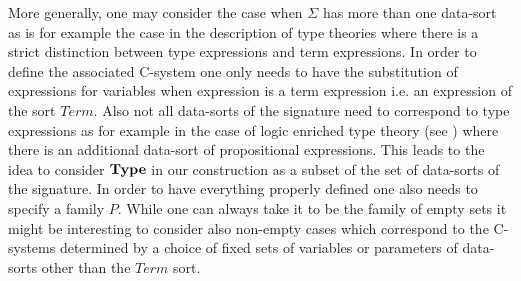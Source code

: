 \documentclass[11pt]{article}
\begin{document}
{More generally, one may consider the case when $\Sigma$ has more than one data-sort as is for example the case in the description of type theories where there is a strict distinction between type expressions and term expressions. In order to define the associated C-system one only needs to have the substitution of expressions for variables when expression is a term expression i.e. an expression of the sort $Term$. Also not all data-sorts of the signature need to correspond to type expressions as for example in the case of logic enriched type theory (see \cite{AczelGambino}) where there is an additional data-sort of propositional expressions. This leads to the idea to consider $\bf Type$ in our construction as a subset of the set of data-sorts of the signature. In order to have everything properly defined one also needs to specify a family $P$. While one can always take it to be the family of empty sets it might be interesting to consider also non-empty cases which correspond to the C-systems determined by a choice of fixed sets of variables or parameters of data-sorts other than the $Term$ sort. 

}
\end{document}
